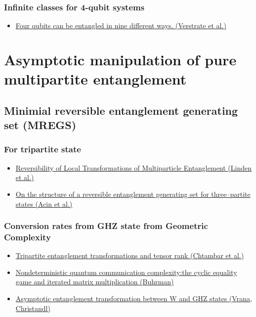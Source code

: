 \documentclass[11pt]{article}
\begin{document}
\subsubsection{Infinite classes for 4-qubit systems}
\label{sec:org7757441}
\begin{itemize}
\item \href{https://arxiv.org/pdf/quant-ph/0109033.pdf}{Four qubits can be entangled in nine different ways. (Verstrate et al.)}
\end{itemize}


\section{Asymptotic manipulation of pure multipartite entanglement}
\label{sec:org08b2af6}

\subsection{Minimial reversible entanglement generating set (MREGS)}
\label{sec:orgc07a1c9}
\subsubsection{For tripartite state}
\label{sec:org8a5d312}
\begin{itemize}
\item \href{https://static1.squarespace.com/static/54563869e4b07b34ee649b68/t/54cfc16ee4b0aaa4b1486791/1422901614622/083.+art\%253A10.1007\%252Fs11128-005-4608-0.pdf}{Reversibility of Local Transformations of Multiparticle Entanglement (Linden et al.)}
\item \href{https://arxiv.org/pdf/quant-ph/0202056.pdf}{On the structure of a reversible entanglement generating set for three–partite states (Acin et al.)}
\end{itemize}

\subsubsection{Conversion rates from GHZ state from Geometric Complexity}
\label{sec:org467692a}
\begin{itemize}
\item \href{https://arxiv.org/pdf/0805.2977.pdf}{Tripartite entanglement transformations and tensor rank (Chtambar et al.)}
\item \href{https://arxiv.org/pdf/1603.03757.pdf}{Nondeterministic quantum communication complexity:the cyclic equality game and iterated matrix multiplication (Buhrman)}
\item \href{https://arxiv.org/pdf/1310.3244.pdf}{Asymptotic entanglement transformation between W and GHZ states (Vrana, Christandl)}
\end{itemize}
\end{document}

